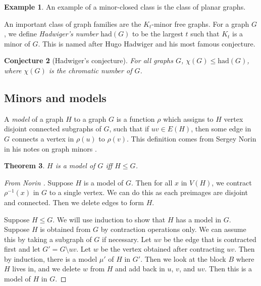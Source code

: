 \documentclass[]{report}
\newcommand{\had}{\text{had}}
\newtheorem{theorem}{Theorem}
\newtheorem{conjecture}[theorem]{Conjecture}
\theoremstyle{definition}
\newtheorem{example}[theorem]{Example}
\numberwithin{theorem}{section}
\numberwithin{equation}{section}
\begin{document}
\begin{example}
	An example of a minor-closed class is the class of planar graphs. 
\end{example}

An important class of graph families are the $K_t$-minor free graphs. For a graph $G$, we define \textit{Hadwiger's number} $\had(G)$ to be the largest $t$ such that $K_t$ is a minor of $G$. This is named after Hugo Hadwiger and his most famous conjecture.

\begin{conjecture}[Hadwiger's conjecture]\cite{hadwigerUeberKlassifikationStreckenkomplexe1943}
	For all graphs $G$, $\chi(G) \leq \had(G)$, where $\chi(G)$ is the \textit{chromatic number} of $G$. 
\end{conjecture}

\subsection{Minors and models}
A \textit{model} of a graph $H$ to a graph $G$ is a function $\rho$ which assigns to $H$ vertex disjoint connected subgraphs of $G$, such that if $uv \in E(H)$, then some edge in $G$ connects a vertex in $\rho(u)$ to $\rho(v)$. This definition comes from Sergey Norin in his notes on graph minors \cite{norinMath599GraphMinors2017}. 

\begin{theorem}
	$H$ is a model of $G$ iff $ H \leq G$. 
\end{theorem}

\begin{proof}[From Norin \cite{norinMath599GraphMinors2017}]
	Suppose $H$ is a model of $G$. Then for all $x$ in $V(H)$, we contract $\rho^{-1}(x)$ in $G$ to a single vertex. We can do this as each preimages are disjoint and connected. Then we delete edges to form $H$. 
	
	Suppose $H \leq G$. We will use induction to show that $H$ has a model in $G$. Suppose $H$ is obtained from $G$ by contraction operations only. We can assume this by taking a subgraph of $G$ if necessary. Let $uv$ be the edge that is contracted first and let $G' = G \setminus uv$. Let $w$ be the vertex obtained after contracting $uv$. Then by induction, there is a model $\mu'$ of $H$ in $G'$. Then we look at the block $B$ where $H$ lives in, and we delete $w$ from $H$ and add back in $u$, $v$, and $uv$. Then this is a model of $H$ in $G$. 
\end{proof}
\end{document}
